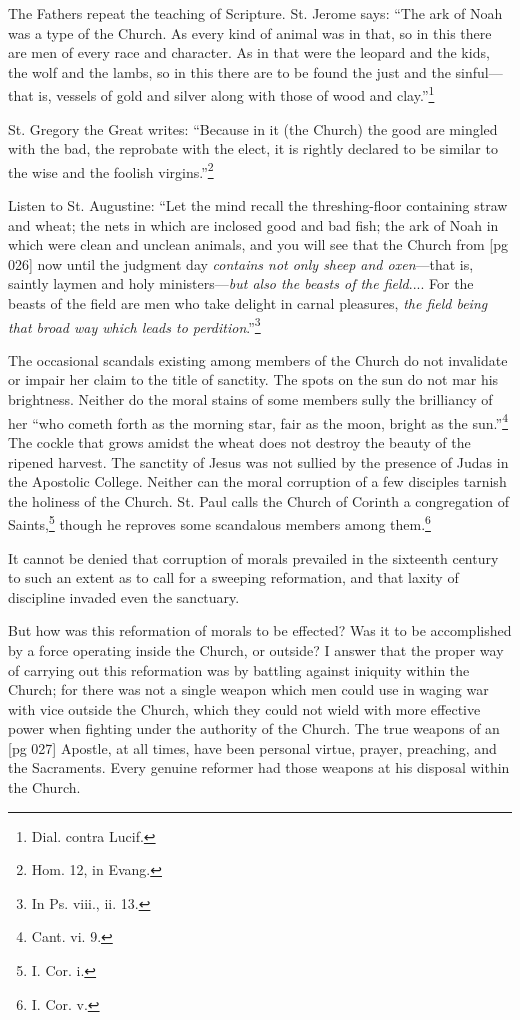 The Fathers repeat the teaching of Scripture.
St. Jerome says: “The ark of Noah was a type of
the Church. As every kind of animal was in that,
so in this there are men of every race and character.
As in that were the leopard and the kids, the
wolf and the lambs, so in this there are to be found
the just and the sinful—that is, vessels of gold and
silver along with those of wood and clay.”\footnote{Dial.
contra Lucif.}

St. Gregory the Great writes: “Because in it
(the Church) the good are mingled with the bad,
the reprobate with the elect, it is rightly declared
to be similar to the wise and the foolish virgins.”\footnote{Hom.
12, in Evang.}

Listen to St. Augustine: “Let the mind recall
the threshing-floor containing straw and wheat;
the nets in which are inclosed good and bad fish;
the ark of Noah in which were clean and unclean
animals, and you will see that the Church from
[pg 026]
now until the judgment day \emph{contains not only
sheep and oxen}—that is, saintly laymen and holy
ministers—\emph{but also the beasts of the field}....
For the beasts of the field are men who take delight
in carnal pleasures, \emph{the field being that broad
way which leads to perdition}.”\footnote{In
Ps. viii., ii. 13.}

The occasional scandals existing among members
of the Church do not invalidate or impair her
claim to the title of sanctity. The spots on the sun
do not mar his brightness. Neither do the moral
stains of some members sully the brilliancy of
her “who cometh forth as the morning star, fair as
the moon, bright as the sun.”\footnote{Cant.
vi. 9.} The cockle that
grows amidst the wheat does not destroy the
beauty of the ripened harvest. The sanctity of
Jesus was not sullied by the presence of Judas in
the Apostolic College. Neither can the moral corruption
of a few disciples tarnish the holiness of
the Church. St. Paul calls the Church of Corinth
a congregation of Saints,\footnote{I.
Cor. i.} though he reproves
some scandalous members among them.\footnote{I. Cor. v.}

It cannot be denied that corruption of morals
prevailed in the sixteenth century to such an extent
as to call for a sweeping reformation, and that
laxity of discipline invaded even the sanctuary.

But how was this reformation of morals to be
effected? Was it to be accomplished by a force
operating inside the Church, or outside? I answer
that the proper way of carrying out this reformation
was by battling against iniquity within
the Church; for there was not a single weapon
which men could use in waging war with vice outside
the Church, which they could not wield with
more effective power when fighting under the authority
of the Church. The true weapons of an
[pg 027]
Apostle, at all times, have been personal virtue,
prayer, preaching, and the Sacraments. Every
genuine reformer had those weapons at his disposal
within the Church.

